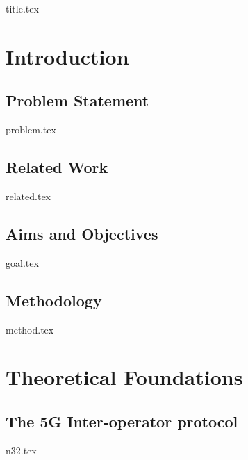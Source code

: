\documentclass[a4paper,12pt,twoside]{report}
\begin{document}
{title.tex}
\pagestyle{empty}
\clearpage

{}
\pagestyle{plain}
\setcounter{page}{3}
\setcounter{tocdepth}{2}
\tableofcontents

\clearpage

\listoffigures

\listoftables

\printglossary

\printglossary[type=\acronymtype,title=Acronyms]

\chapter{Introduction}
\label{chap:intro}

\section{Problem Statement}
\label{sec:problem}
{problem.tex}

\section{Related Work}
\label{sec:related}
{related.tex}

\section{Aims and Objectives}
\label{sec:goal}
{goal.tex}

\section{Methodology}
\label{sec:method}
{method.tex}

\clearpage

\chapter{Theoretical Foundations}
\label{chap:theory}

\section{The 5G Inter-operator protocol}
\label{sec:n32}
{n32.tex}
\end{document}
